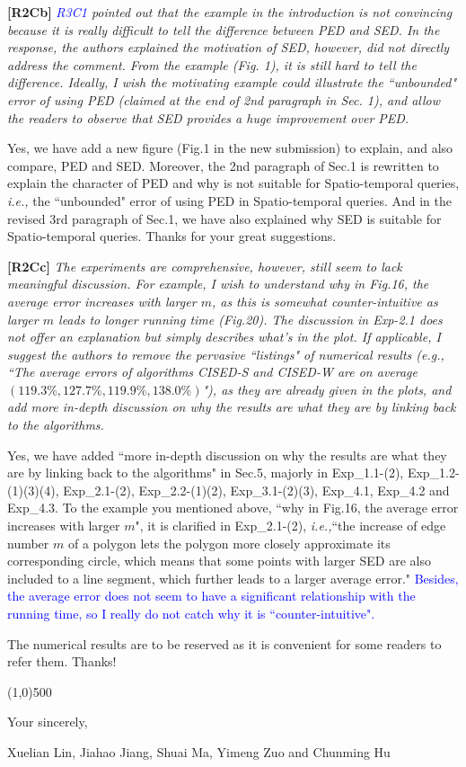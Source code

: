 \documentclass{letter}
\newcommand{\ie}{\emph{i.e.,}\xspace}
\begin{document}
\textbf{[R2Cb]} \emph{\textcolor{blue}{R3C1} pointed out that the example in the introduction is not convincing because it is really difficult to tell the difference between PED and SED. In the response, the authors explained the motivation of SED, however, did not directly address the comment. From the example (Fig. 1), it is still hard to tell the difference. Ideally, I wish the motivating example could illustrate the ``unbounded" error of using PED (claimed at the end of 2nd paragraph in Sec. 1), and allow the readers to observe that SED provides a huge improvement over PED.}

Yes, we have add a new figure (Fig.1 in the new submission) to explain, and also compare, PED and SED. Moreover, the 2nd paragraph of Sec.1 is rewritten to explain the character of PED and why is not suitable for Spatio-temporal queries, \ie the ``unbounded" error of using PED in Spatio-temporal queries. And in the revised 3rd paragraph of Sec.1, we have also explained why SED is suitable for Spatio-temporal queries.
Thanks for your great suggestions.

\textbf{[R2Cc]} \emph{The experiments are comprehensive, however, still seem to lack meaningful discussion. For example, I wish to understand why in Fig.16, the average error increases with larger $m$, as this is somewhat counter-intuitive as larger $m$ leads to longer running time (Fig.20). The discussion in Exp-2.1 does not offer an explanation but simply describes what's in the plot. If applicable, I suggest the authors to remove the pervasive ``listings" of numerical results (e.g., ``The average errors of algorithms CISED-S and CISED-W are on average $(119.3\%, 127.7\%, 119.9\%, 138.0\%)$"), as they are already given in the plots, and add more in-depth discussion on why the results are what they are by linking back to the algorithms. }

Yes, we have added ``more in-depth discussion on why the results are what they are by linking back to the algorithms" in Sec.5, majorly in Exp\_1.1-(2), Exp\_1.2-(1)(3)(4), Exp\_2.1-(2), Exp\_2.2-(1)(2), Exp\_3.1-(2)(3), Exp\_4.1, Exp\_4.2 and Exp\_4.3.
To the example you mentioned above,  ``why in Fig.16, the average error increases with larger $m$", it is clarified in Exp\_2.1-(2), \ie ``the increase of edge number $m$ of a polygon lets the polygon more closely approximate its corresponding circle, which means that some points with larger SED are also included to a line segment, which further leads to a larger average error." \textcolor{blue}{Besides, the average error does not seem to have a significant relationship with the running time, so I really do not catch why it is ``counter-intuitive".}

The numerical results are to be reserved as it is convenient for some readers to refer them. Thanks!


\line(1,0){500}



Your sincerely,

Xuelian Lin, Jiahao Jiang, Shuai Ma, Yimeng Zuo and Chunming Hu



%
%
\end{document}

